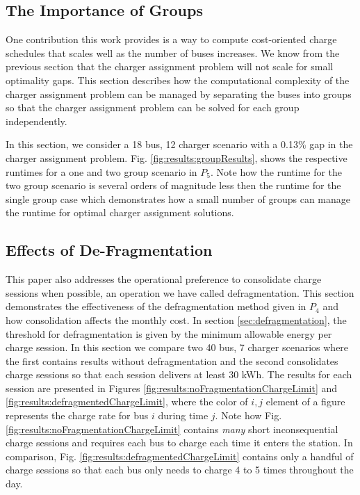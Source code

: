 \subsection{The Importance of Groups}

One contribution this work provides is a way to compute cost-oriented charge schedules that scales well as the number of buses increases. We know from the previous section that the charger assignment problem will not scale for small optimality gaps. This section describes how the computational complexity of the charger assignment problem can be managed by separating the buses into groups so that the charger assignment problem can be solved for each group independently.

\par In this section, we consider a 18 bus, 12 charger scenario with a 0.13\% gap in the charger assignment problem. Fig. \ref{fig:results:groupResults}, shows the respective runtimes for a one and two group scenario in $P_5$. Note how the runtime for the two group scenario is several orders of magnitude less then the runtime for the single group case which demonstrates how a small number of groups can manage the runtime for optimal charger assignment solutions.


\subsection{Effects of De-Fragmentation}

This paper also addresses the operational preference to consolidate charge sessions when possible, an operation we have called defragmentation. This section demonstrates the effectiveness of the defragmentation method given in $P_4$ and how consolidation affects the monthly cost. In section \ref{sec:defragmentation}, the threshold for defragmentation is given by the minimum allowable energy per charge session. In this section we compare two 40 bus, 7 charger scenarios where the first contains results without defragmentation and the second consolidates charge sessions so that each session delivers at least 30 kWh. The results for each session are presented in Figures \ref{fig:results:noFragmentationChargeLimit} and \ref{fig:results:defragmentedChargeLimit}, where the color of $i,j$ element of a figure represents the charge rate for bus $i$ during time $j$. Note how Fig. \ref{fig:results:noFragmentationChargeLimit} contains {\it many} short inconsequential charge sessions and requires each bus to charge each time it enters the station. In comparison, Fig. \ref{fig:results:defragmentedChargeLimit} contains only a handful of charge sessions so that each bus only needs to charge 4 to 5 times throughout the day.

